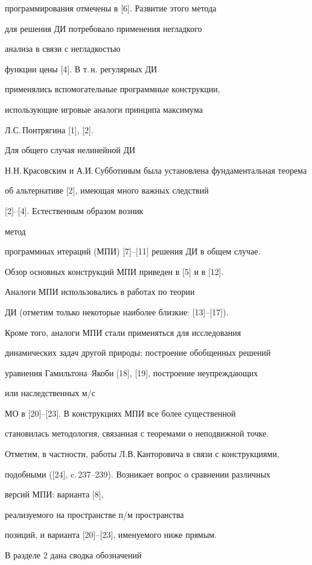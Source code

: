 программирования отмечены в [6]. Развитие этого метода


для решения ДИ потребовало применения негладкого


анализа в связи с негладкостью


функции цены [4]. В т.\,н. регулярных ДИ


применялись вспомогательные программные конструкции,


использующие игровые аналоги принципа максимума


Л.С.\,Понтрягина [1], [2].


Для общего случая нелинейной ДИ


Н.Н.\,Красовским и А.И.\,Субботиным была установлена фундаментальная теорема


об альтернативе [2], имеющая много важных следствий


[2]--[4]. Естественным образом возник


метод


программных итераций (МПИ) [7]--[11] решения ДИ в общем случае.


Обзор основных конструкций МПИ приведен в [5] и в [12].


Аналоги МПИ использовались в работах по теории


ДИ (отметим только некоторые наиболее близкие: [13]--[17]).


Кроме того, аналоги МПИ стали применяться для исследования


динамических задач другой природы: построение обобщенных решений


уравнения Гамильтона--Якоби [18], [19], построение неупреждающих


или наследственных м/с


МО в [20]--[23]. В конструкциях МПИ все более существенной


становилась методология, связанная с теоремами о неподвижной точке.


Отметим, в частности, работы Л.В.\,Канторовича в связи с конструкциями,


подобными ([24], c.\,237--239). Возникает вопрос о сравнении различных


версий МПИ: варианта [8],


реализуемого на пространстве п/м пространства


позиций, и варианта [20]--[23], именуемого ниже прямым.





В разделе 2 дана сводка обозначений


